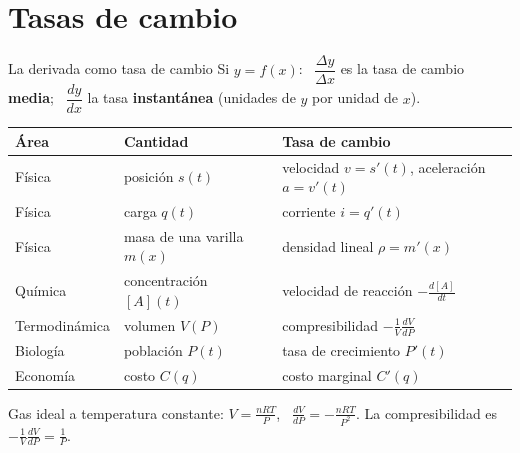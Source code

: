 \documentclass[10pt,aspectratio=169]{beamer}
\begin{document}
\section{Tasas de cambio}

\begin{frame}{La derivada como tasa de cambio}
  Si $y=f(x)$: \ $\dfrac{\Delta y}{\Delta x}$ es la tasa de cambio \textbf{media}; \ $\dfrac{dy}{dx}$ la tasa \textbf{instantánea} (unidades de $y$ por unidad de $x$).
  \renewcommand{\arraystretch}{1.4}
  \begin{center}
    \begin{tabular}{l|l|l}
      \textbf{Área} & \textbf{Cantidad} & \textbf{Tasa de cambio}\\ \hline
      Física & posición $s(t)$ & velocidad $v=s'(t)$, aceleración $a=v'(t)$\\
      Física & carga $q(t)$ & corriente $i=q'(t)$\\
      Física & masa de una varilla $m(x)$ & densidad lineal $\rho=m'(x)$\\
      Química & concentración $[A](t)$ & velocidad de reacción $-\frac{d[A]}{dt}$\\
      Termodinámica & volumen $V(P)$ & compresibilidad $-\frac1V\frac{dV}{dP}$\\
      Biología & población $P(t)$ & tasa de crecimiento $P'(t)$\\
      Economía & costo $C(q)$ & costo marginal $C'(q)$
    \end{tabular}
  \end{center}
  \begin{ejemplo}[1]
    Gas ideal a temperatura constante: $V=\frac{nRT}{P}$, \ $\frac{dV}{dP}=-\frac{nRT}{P^2}$. La compresibilidad es $-\frac1V\frac{dV}{dP}=\frac1P$.
  \end{ejemplo}
\end{frame}
\end{document}
